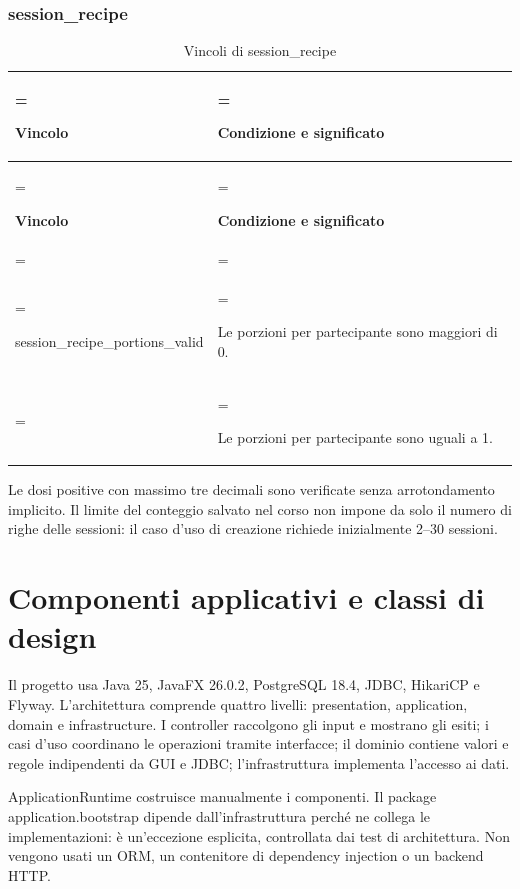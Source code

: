 \documentclass[11pt,a4paper]{article}
\begin{document}
\subsubsection{session\_recipe}
{\small\renewcommand{\arraystretch}{1.25}
\begin{xltabular}{\linewidth}{>{\hsize\linewidth=\hsize\raggedright\arraybackslash}X>{\hsize\linewidth=\hsize\raggedright\arraybackslash}X}
\caption{Vincoli di session\_recipe}\label{tab:dictionary-45}\\
\toprule
\textbf{Vincolo} & \textbf{Condizione e significato}\\\midrule\endfirsthead\toprule\textbf{Vincolo} & \textbf{Condizione e significato}\\\midrule\endhead
\midrule{}\\\endfoot\bottomrule\endlastfoot

{\ttfamily\small session\_\allowbreak{}recipe\_\allowbreak{}portions\_\allowbreak{}valid} & Le porzioni per partecipante sono maggiori di 0.\\ & Le porzioni per partecipante sono uguali a 1.\\*
\end{xltabular}}

Le dosi positive con massimo tre decimali sono verificate senza arrotondamento implicito. Il limite del conteggio salvato nel corso non impone da solo il numero di righe delle sessioni: il caso d’uso di creazione richiede inizialmente 2--30 sessioni.

\clearpage\section{Componenti applicativi e classi di design}

Il progetto usa Java 25, JavaFX 26.0.2, PostgreSQL 18.4, JDBC, HikariCP e Flyway. L’architettura comprende quattro livelli: presentation, application, domain e infrastructure. I controller raccolgono gli input e mostrano gli esiti; i casi d'uso coordinano le operazioni tramite interfacce; il dominio contiene valori e regole indipendenti da GUI e JDBC; l'infrastruttura implementa l'accesso ai dati.

ApplicationRuntime costruisce manualmente i componenti. Il package application.bootstrap dipende dall'infrastruttura perché ne collega le implementazioni: è un'eccezione esplicita, controllata dai test di architettura. Non vengono usati un ORM, un contenitore di dependency injection o un backend HTTP.
\end{document}
